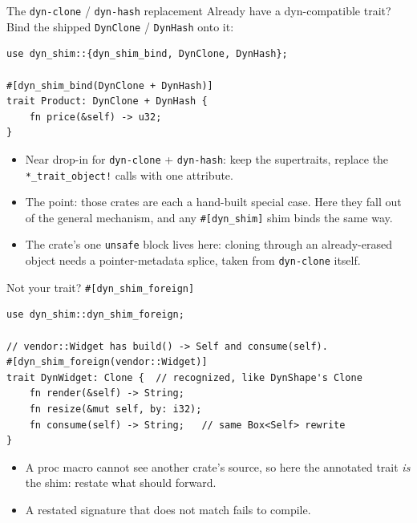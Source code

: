 \documentclass[aspectratio=169]{beamer}
\begin{document}
\begin{frame}[fragile]{The \texttt{dyn-clone} / \texttt{dyn-hash} replacement}
  Already have a dyn-compatible trait? Bind the shipped
  \texttt{DynClone} / \texttt{DynHash} onto it:
\begin{lstlisting}
use dyn_shim::{dyn_shim_bind, DynClone, DynHash};

#[dyn_shim_bind(DynClone + DynHash)]
trait Product: DynClone + DynHash {
    fn price(&self) -> u32;
}
\end{lstlisting}
  \begin{itemize}
    \item Near drop-in for \texttt{dyn-clone} + \texttt{dyn-hash}: keep the
          supertraits, replace the \texttt{*\_trait\_object!} calls with one
          attribute.
    \item The point: those crates are each a hand-built special case.
          Here they fall out of the general mechanism, and any
          \texttt{\#[dyn\_shim]} shim binds the same way.
    \item The crate's one \texttt{unsafe} block lives here: cloning through
          an already-erased object needs a pointer-metadata splice, taken
          from \texttt{dyn-clone} itself.
  \end{itemize}
\end{frame}


\begin{frame}[fragile]{Not your trait? \texttt{\#[dyn\_shim\_foreign]}}
\begin{lstlisting}
use dyn_shim::dyn_shim_foreign;

// vendor::Widget has build() -> Self and consume(self).
#[dyn_shim_foreign(vendor::Widget)]
trait DynWidget: Clone {  // recognized, like DynShape's Clone
    fn render(&self) -> String;
    fn resize(&mut self, by: i32);
    fn consume(self) -> String;   // same Box<Self> rewrite
}
\end{lstlisting}
  \begin{itemize}
    \item A proc macro cannot see another crate's source, so here the
          annotated trait \emph{is} the shim: restate what should forward.
    \item A restated signature that does not match fails to compile.
  \end{itemize}
\end{frame}
\end{document}
